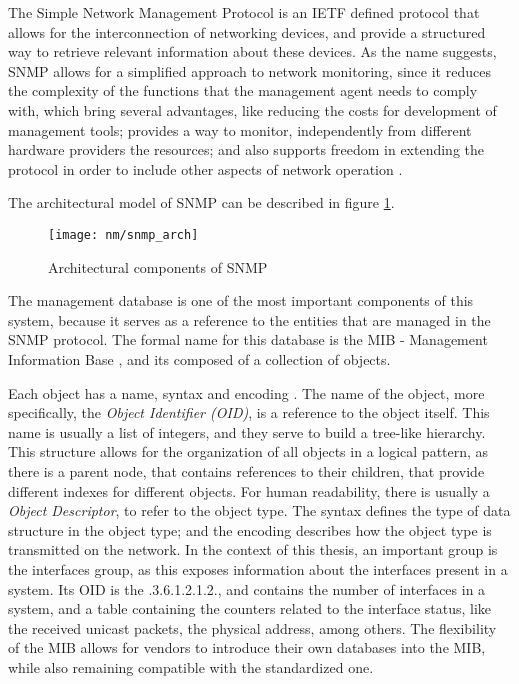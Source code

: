 The Simple Network Management Protocol is an IETF defined protocol that allows for the interconnection of networking devices, and provide a structured way to
retrieve relevant information about these devices. As the name suggests, SNMP allows for a simplified approach to network monitoring, since it reduces the complexity
of the functions that the management agent needs to comply with, which bring several advantages, like reducing the costs for development of management tools;
provides a way to monitor, independently from different hardware providers the resources; and also supports freedom in extending the protocol in order to include
other aspects of network operation \cite{fedor_simple_1990}.
\par The architectural model of SNMP can be described in figure \ref{fig:snmp}.
    
\begin{figure} [!htbp]
    \centering
    \texttt{[image: nm/snmp\_arch]}
    \caption{Architectural components of SNMP}
    \label{fig:snmp}
\end{figure}

The management database is one of the most important components of this system, because it serves as a reference to the entities that are managed in the SNMP
protocol. The formal name for this database is the MIB - Management Information Base \cite{rose_structure_1990}, and its composed of a collection of objects.

\par Each object has a name, syntax and encoding \cite {CITE - RFC 1156}. The name of the object, more specifically, the \textit {Object Identifier (OID)}, is a
reference to the object itself. This name is usually a list of integers, and they serve to build a tree-like hierarchy. This structure allows for the organization 
of all objects in a logical pattern, as there is a parent node, that contains references to their children, that provide different indexes for different objects. 
For human readability, there is usually a \textit {Object Descriptor}, to refer to the object type. The syntax defines the type of data structure in the object type;
and the encoding describes how the object type is transmitted on the network. In the context of this thesis, an important group is the interfaces group, as this
exposes information about the interfaces present in a system. Its OID is the .3.6.1.2.1.2., and contains the number of interfaces in a system, and a table containing
the counters related to the interface status, like the received unicast packets, the physical address, among others. The flexibility of the MIB allows for vendors 
to introduce their own databases into the MIB, while also remaining compatible with the standardized one.


